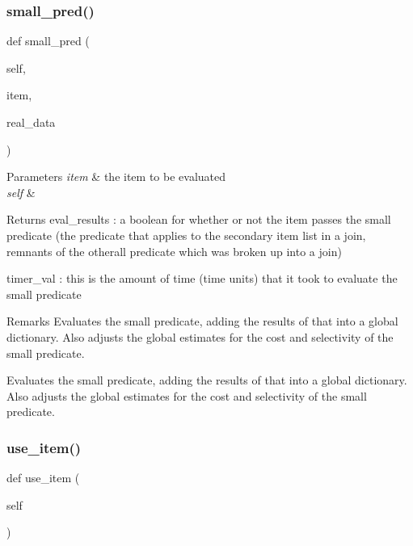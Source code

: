\subsubsection{\texorpdfstring{small\_pred()}{small\_pred()}}
{\footnotesize\ttfamily def small\+\_\+pred (\begin{DoxyParamCaption}\item[{}]{self,  }\item[{}]{item,  }\item[{}]{real\+\_\+data }\end{DoxyParamCaption})}


\begin{DoxyParams}{Parameters}
{\em item} & the item to be evaluated \\
\hline
{\em self} & \\
\hline
\end{DoxyParams}
\begin{DoxyReturn}{Returns}
eval\+\_\+results \+: a boolean for whether or not the item passes the small predicate (the predicate that applies to the secondary item list in a join, remnants of the otherall predicate which was broken up into a join) 

timer\+\_\+val \+: this is the amount of time (time units) that it took to evaluate the small predicate 
\end{DoxyReturn}
\begin{DoxyRemark}{Remarks}
Evaluates the small predicate, adding the results of that into a global dictionary. Also adjusts the global estimates for the cost and selectivity of the small predicate.\begin{DoxyVerb}Evaluates the small predicate, adding the results of that into a global dictionary. 
Also adjusts the global estimates for the cost and selectivity of the small predicate.\end{DoxyVerb}
 
\end{DoxyRemark}
\mbox{\label{classdynamicfilterapp_1_1models_1_1_join_a53b3d6276057a6991b0e03cacb4818a9}} 
\subsubsection{\texorpdfstring{use\_item()}{use\_item()}}
{\footnotesize\ttfamily def use\+\_\+item (\begin{DoxyParamCaption}\item[{}]{self }\end{DoxyParamCaption})}


